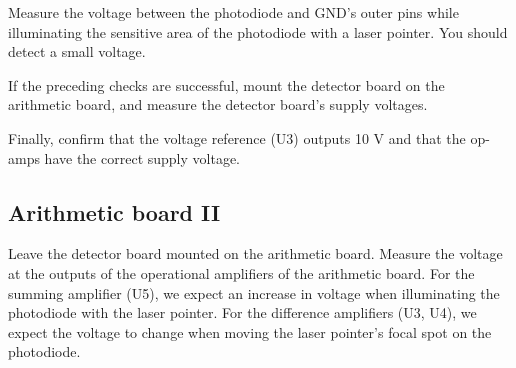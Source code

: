 Measure the voltage between the photodiode and GND's outer pins while illuminating the sensitive area of the photodiode with a laser pointer.
You should detect a small voltage.

If the preceding checks are successful, mount the detector board on the arithmetic board, and measure the detector board's supply voltages.

Finally, confirm that the voltage reference (U3) outputs 10 V and that the op-amps have the correct supply voltage.

\subsection{Arithmetic board II}

Leave the detector board mounted on the arithmetic board.
Measure the voltage at the outputs of the operational amplifiers of the arithmetic board.
For the summing amplifier (U5), we expect an increase in voltage when illuminating the photodiode with the laser pointer.
For the difference amplifiers (U3, U4), we expect the voltage to change when moving the laser pointer's focal spot on the photodiode.

